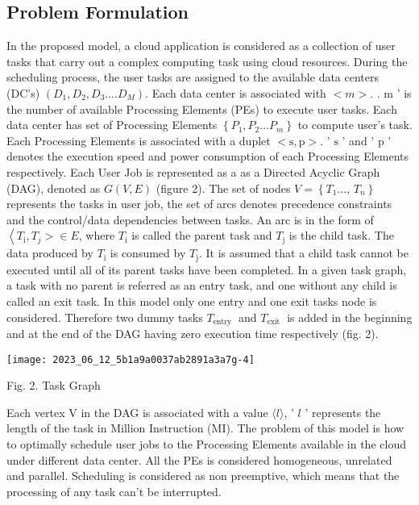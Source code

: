 \documentclass[10pt]{article}
\begin{document}
\subsection{Problem Formulation}
In the proposed model, a cloud application is considered as a collection of user tasks that carry out a complex computing task using cloud resources. During the scheduling process, the user tasks are assigned to the available data centers (DC's) $\left(D_{1}, D_{2}, D_{3} \ldots . D_{M}\right)$. Each data center is associated with $<m>$. . $\mathrm{m}$ ' is the number of available Processing Elements (PEs) to execute user tasks. Each data center has set of Processing Elements $\left\{P_{1}, P_{2} \ldots P_{m}\right\}$ to compute user's task. Each Processing Elements is associated with a duplet $<\mathrm{s}, \mathrm{p}>$. ' $\mathrm{s}$ ' and ' $\mathrm{p}$ ' denotes the execution speed and power consumption of each Processing Elements respectively. Each User Job is represented as a as a Directed Acyclic Graph (DAG), denoted as $G(V, E)$ (figure 2). The set of nodes $V=\left\{T_{1} \ldots\right.$, $\left.T_{n}\right\}$ represents the tasks in user job, the set of arcs denotes precedence constraints and the control/data dependencies between tasks. An arc is in the form of $\left\langle T_{\mathrm{i}}, T_{j}>\in E\right.$, where $T_{\mathrm{i}}$ is called the parent task and $T_{\mathrm{j}}$ is the child task. The data produced by $T_{\mathrm{i}}$ is consumed by $T_{\mathrm{j}}$. It is assumed that a child task cannot be executed until all of its parent tasks have been completed. In a given task graph, a task with no parent is referred as an entry task, and one without any child is called an exit task. In this model only one entry and one exit tasks node is considered. Therefore two dummy tasks $T_{\text {entry }}$ and $T_{\text {exit }}$ is added in the beginning and at the end of the DAG having zero execution time respectively (fig. 2).

\begin{center}
\texttt{[image: 2023\_06\_12\_5b1a9a0037ab2891a3a7g-4]}
\end{center}

Fig. 2. Task Graph

Each vertex $\mathrm{V}$ in the DAG is associated with a value $\langle l\rangle$, ' $l$ ' represents the length of the task in Million Instruction (MI). The problem of this model is how to optimally schedule user jobs to the Processing Elements available in the cloud under different data center. All the PEs is considered homogeneous, unrelated and parallel. Scheduling is considered as non preemptive, which means that the processing of any task can't be interrupted.
\end{document}
